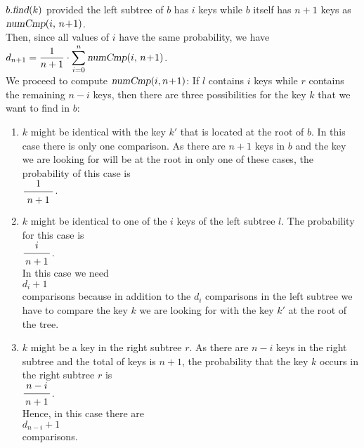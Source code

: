 $b.\textsl{find}(k)$ provided the left subtree of $b$ has $i$ keys while $b$ itself has $n+1$ keys
as
\\[0.2cm]
\hspace*{1.3cm}
$\textsl{numCmp}(i,\, n\!+\!1)$.
\\[0.2cm]
Then, since all values of $i$ have the same probability, we have
\\[0.2cm]
\hspace*{1.3cm}
$\displaystyle d_{n+1} =  \frac{1}{n+1} \cdot \sum\limits_{i=0}^n \textsl{numCmp}(i,\, n\!+\!1)$.
\\[0.2cm]
We proceed to compute $\textsl{numCmp}(i,n\!+\!1)$:
If  $l$ contains $i$ keys while $r$ contains the remaining $n-i$ keys,
then there are three possibilities for the key $k$ that we want to find in $b$:
\begin{enumerate}
\item $k$ might be identical with the key $k'$ that is located at the root of $b$.
      In this case there is only one comparison.
      As there  are $n+1$ keys in $b$ and the key we are looking for will be at the root in only
      one of these cases, the probability of this case is
      \\[0.2cm]
      \hspace*{1.3cm} $\bruch{1}{\,n+1\,}$.

\item $k$ might be identical to one of the  $i$ keys of the left subtree $l$.
      The probability for this case is 
      \\[0.2cm]
      \hspace*{1.3cm} $\displaystyle\bruch{i}{n+1}$. \\[0.2cm]
      In this case we need 
      \\[0.2cm]
      \hspace*{1.3cm} $\displaystyle d_i + 1$ \\[0.2cm]
      comparisons because in addition to the  $d_i$ comparisons in the left subtree we have to
      compare the key $k$ we are looking for with the key $k'$ at the root of the tree.
\item $k$ might be a key in the right subtree $r$.  As there are  $n-i$ keys in the right subtree
      and the total of keys is $n+1$, the probability that the key  $k$ occurs in the right subtree $r$
      is \\[0.2cm]
      \hspace*{1.3cm} $\displaystyle \bruch{n-i}{n+1}$. \\[0.2cm]
      Hence, in this case there are  \\[0.2cm]
      \hspace*{1.3cm} $\displaystyle d_{n-i} + 1$ \\[0.2cm]
      comparisons. 
\end{enumerate}
